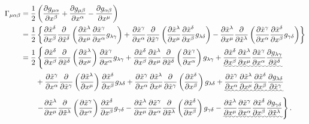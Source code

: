 \documentclass[a4paper,pdftex,10pt]{article}
\begin{document}
\begin{align}
  \Gamma_{\mu\alpha\beta}
   & =
  \frac{1}{2}
  \left(
  \pdv{g_{\mu\alpha}}{x^{\beta}}
  +
  \pdv{g_{\mu\beta}}{x^{\alpha}}
  -
  \pdv{g_{\alpha\beta}}{x^{\mu}}
  \right)
  \nonumber
  \\
   & =
  \frac{1}{2}
  \left\{
  \pdv{\tilde{x}^{\delta}}{x^{\beta}}\pdv{}{\tilde{x}^{\delta}}
  \left(
  \pdv{\tilde{x}^{\lambda}}{x^{\mu}}\pdv{\tilde{x}^{\gamma}}{x^{\alpha}}g_{\lambda\gamma}
  \right)
  +
  \pdv{\tilde{x}^{\gamma}}{x^{\alpha}}\pdv{}{\tilde{x}^{\gamma}}
  \left(
  \pdv{\tilde{x}^{\lambda}}{x^{\mu}}\pdv{\tilde{x}^{\delta}}{x^{\beta}}g_{\lambda\delta}
  \right)
  -
  \pdv{\tilde{x}^{\lambda}}{x^{\mu}}\pdv{}{\tilde{x}^{\lambda}}
  \left(
  \pdv{\tilde{x}^{\gamma}}{x^{\alpha}}\pdv{\tilde{x}^{\delta}}{x^{\beta}}g_{\gamma\delta}
  \right)
  \nonumber
  \right\}
  \nonumber
  \\
   & =
  \frac{1}{2}
  \left\{
  \pdv{\tilde{x}^{\delta}}{x^{\beta}}\pdv{}{\tilde{x}^{\delta}}
  \left( \pdv{\tilde{x}^{\lambda}}{x^{\mu}} \right)
  \pdv{\tilde{x}^{\gamma}}{x^{\alpha}}g_{\lambda\gamma}
  +
  \pdv{\tilde{x}^{\delta}}{x^{\beta}}
  \pdv{\tilde{x}^{\lambda}}{x^{\mu}}
  \pdv{}{\tilde{x}^{\delta}}
  \left(  \pdv{\tilde{x}^{\gamma}}{x^{\alpha}} \right)
  g_{\lambda\gamma}
  +
  \uwave{
    \pdv{\tilde{x}^{\delta}}{x^{\beta}}
    \pdv{\tilde{x}^{\lambda}}{x^{\mu}}\pdv{\tilde{x}^{\gamma}}{x^{\alpha}}
    \pdv{g_{\lambda\gamma}}{\tilde{x}^{\delta}}
  }
  \right.
  \nonumber
  \\
   & \qquad
  +
  \pdv{\tilde{x}^{\gamma}}{x^{\alpha}}\pdv{}{\tilde{x}^{\gamma}}
  \left(
  \pdv{\tilde{x}^{\lambda}}{x^{\mu}}
  \right)
  \pdv{\tilde{x}^{\delta}}{x^{\beta}}g_{\lambda\delta}
  +
  \pdv{\tilde{x}^{\gamma}}{x^{\alpha}}
  \pdv{\tilde{x}^{\lambda}}{x^{\mu}}
  \pdv{}{\tilde{x}^{\gamma}}
  \left(  \pdv{\tilde{x}^{\delta}}{x^{\beta}}
  \right)
  g_{\lambda\delta}
  +
  \uwave{
    \pdv{\tilde{x}^{\gamma}}{x^{\alpha}}
    \pdv{\tilde{x}^{\lambda}}{x^{\mu}}\pdv{\tilde{x}^{\delta}}{x^{\beta}}
    \pdv{g_{\lambda\delta}}{\tilde{x}^{\gamma}}
  }
  \nonumber
  \\
   & \qquad
  \left.
  -
  \pdv{\tilde{x}^{\lambda}}{x^{\mu}}\pdv{}{\tilde{x}^{\lambda}}
  \left(
  \pdv{\tilde{x}^{\gamma}}{x^{\alpha}}
  \right)
  \pdv{\tilde{x}^{\delta}}{x^{\beta}}g_{\gamma\delta}
  -
  \pdv{\tilde{x}^{\lambda}}{x^{\mu}}\pdv{\tilde{x}^{\gamma}}{x^{\alpha}}
  \pdv{}{\tilde{x}^{\lambda}}
  \left(
  \pdv{\tilde{x}^{\delta}}{x^{\beta}}
  \right)
  g_{\gamma\delta}
  -
  \uwave{
    \pdv{\tilde{x}^{\lambda}}{x^{\mu}}
    \pdv{\tilde{x}^{\gamma}}{x^{\alpha}}\pdv{\tilde{x}^{\delta}}{x^{\beta}}
    \pdv{g_{\gamma\delta}}{\tilde{x}^{\lambda}}
  }
  \right\}
  .
  \label{eqn:1}
\end{align}
\end{document}
